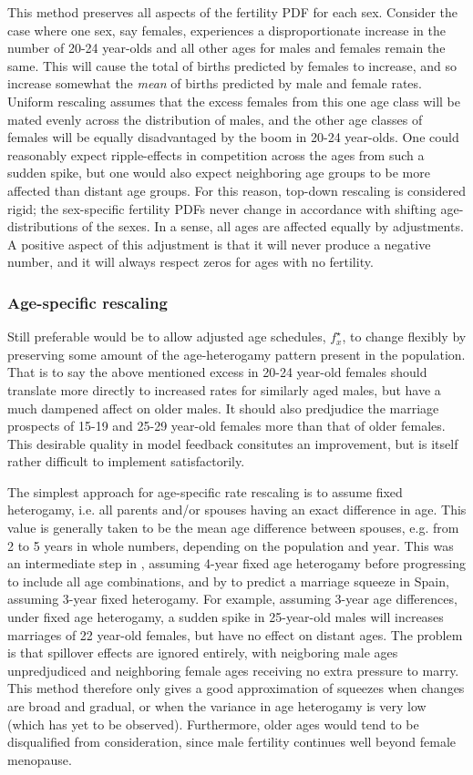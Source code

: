 \documentclass[reqno,12pt,oneside,a4paper]{report} %
\theoremstyle{plain}
\theoremstyle{definition}
\theoremstyle{remark}
\numberwithin{theorem}{chapter}     %
\begin{document}
This method preserves all aspects of the fertility PDF for each sex. Consider the case where one sex, say females, experiences a disproportionate increase in the number of 20-24 year-olds and all other ages for males and females remain the same. This will cause the total of births predicted by females to increase, and so increase somewhat the \textit{mean} of births predicted by male and female rates. Uniform rescaling assumes that the excess females from this one age class will be mated evenly across the distribution of males, and the other age classes of females will be equally disadvantaged by the boom in 20-24 year-olds. One could reasonably expect ripple-effects in competition across the ages from such a sudden spike, but one would also expect neighboring age groups to be more affected than distant age groups. For this reason, top-down rescaling is considered rigid; the sex-specific fertility PDFs never change in accordance with shifting age-distributions of the sexes. In a sense, all ages are affected equally by adjustments. A positive aspect of this adjustment is that it will never produce a negative number, and it will always respect zeros for ages with no fertility.

\subsubsection{Age-specific rescaling}
Still preferable would be to allow adjusted age schedules, $f_x^{\star}$, to change flexibly by preserving some amount of the age-heterogamy pattern present in the population. That is to say the above mentioned excess in 20-24 year-old females should translate more directly to increased rates for similarly aged males, but have a much dampened affect on older males. It should also predjudice the marriage prospects of 15-19 and 25-29 year-old females more than that of older females. This desirable quality in model feedback consitutes an improvement, but is itself rather difficult to implement satisfactorily. 

The simplest approach for age-specific rate rescaling is to assume fixed heterogamy, i.e. all parents and/or spouses having an exact difference in age. This value is generally taken to be the mean age difference between spouses, e.g. from 2 to 5 years in whole numbers, depending on the population and year. This was an intermediate step in \citet{karmel1947relations}, assuming 4-year fixed age heterogamy before progressing to include all age combinations, and by \citet{cabre1997tortulos} to predict a marriage squeeze in Spain, assuming 3-year fixed heterogamy. For example, assuming 3-year age differences, under fixed age heterogamy, a sudden spike in 25-year-old males will increases marriages of 22 year-old females, but have no effect on distant ages. The problem is that spillover effects are ignored entirely, with neigboring male ages unpredjudiced and neighboring female ages receiving no extra pressure to marry. This method therefore only gives a good approximation of squeezes when changes are broad and gradual, or when the variance in age heterogamy is very low (which has yet to be observed). Furthermore, older ages would tend to be disqualified from consideration, since male fertility continues well beyond female menopause.
\end{document}
